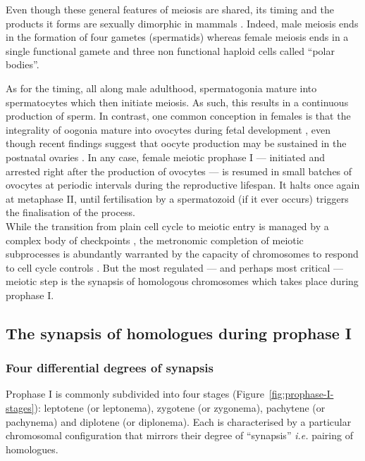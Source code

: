 Even though these general features of meiosis are shared, its timing and the products it forms are sexually dimorphic in mammals \citep[reviewed in][]{handel2010genetics}. 
Indeed, male meiosis ends in the formation of four gametes (spermatids) whereas female meiosis ends in a single functional gamete and three non functional haploid cells called “polar bodies”.

As for the timing, all along male adulthood, spermatogonia mature into spermatocytes which then initiate meiosis. As such, this results in a continuous production of sperm.
In contrast, one common conception in females is that the integrality of oogonia mature into ovocytes during fetal development \citep{pearl1921studies,zuckerman1951number}, even though recent findings suggest that oocyte production may be sustained in the postnatal ovaries \citep{johnson2004germline,johnson2005oocyte}.
In any case, female meiotic prophase I — initiated and arrested right after the production of ovocytes — is resumed in small batches of ovocytes at periodic intervals during the reproductive lifespan.
It halts once again at metaphase II, until fertilisation by a spermatozoid (if it ever occurs) triggers the finalisation of the process.\\

While the transition from plain cell cycle to meiotic entry is managed by a complex body of checkpoints \citep[reviewed in][]{marston2005meiosis}, the metronomic completion of meiotic subprocesses is abundantly warranted by the capacity of chromosomes to respond to cell cycle controls \citep[reviewed in][]{mckim1995chromosomal}.
But the most regulated — and perhaps most critical — meiotic step is the synapsis of homologous chromosomes which takes place during prophase I.



\subsection{The synapsis of homologues during prophase I}
\label{chap2:prophase-I}

\subsubsection{Four differential degrees of synapsis}
Prophase I is commonly subdivided into four stages (Figure~\ref{fig:prophase-I-stages}): leptotene (or leptonema), zygotene (or zygonema), pachytene (or pachynema) and diplotene (or diplonema).
Each is characterised by a particular chromosomal configuration that mirrors their degree of “synapsis” \textit{i.e.} pairing of homologues.

